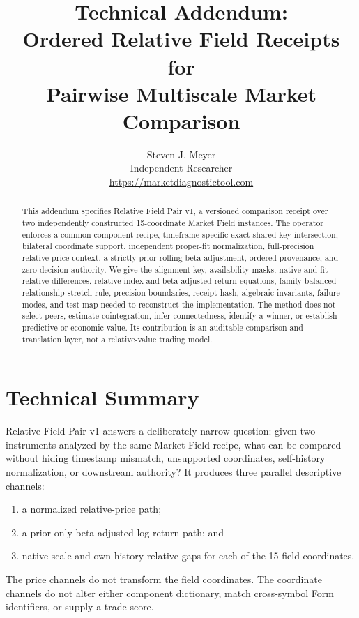 \documentclass{article}
\title{Technical Addendum:\\ Ordered Relative Field Receipts for\\ Pairwise Multiscale Market Comparison}
\author{
Steven J. Meyer\\
Independent Researcher\\
\url{https://marketdiagnostictool.com}\\
}
\newcommand{\Pair}{Relative Field Pair v1}
\begin{document}
\maketitle
\ifdefined\relativefieldsharecopy
{}
\fi

\begin{abstract}
This addendum specifies \Pair{}, a versioned comparison receipt over two independently constructed 15-coordinate Market Field instances. The operator enforces a common component recipe, timeframe-specific exact shared-key intersection, bilateral coordinate support, independent proper-fit normalization, full-precision relative-price context, a strictly prior rolling beta adjustment, ordered provenance, and zero decision authority. We give the alignment key, availability masks, native and fit-relative differences, relative-index and beta-adjusted-return equations, family-balanced relationship-stretch rule, precision boundaries, receipt hash, algebraic invariants, failure modes, and test map needed to reconstruct the implementation. The method does not select peers, estimate cointegration, infer connectedness, identify a winner, or establish predictive or economic value. Its contribution is an auditable comparison and translation layer, not a relative-value trading model.
\end{abstract}

\section{Technical Summary}

\Pair{} answers a deliberately narrow question: given two instruments analyzed by the same Market Field recipe, what can be compared without hiding timestamp mismatch, unsupported coordinates, self-history normalization, or downstream authority? It produces three parallel descriptive channels:
\begin{enumerate}
    \item a normalized relative-price path;
    \item a prior-only beta-adjusted log-return path; and
    \item native-scale and own-history-relative gaps for each of the 15 field coordinates.
\end{enumerate}
The price channels do not transform the field coordinates. The coordinate channels do not alter either component dictionary, match cross-symbol Form identifiers, or supply a trade score.
\end{document}
